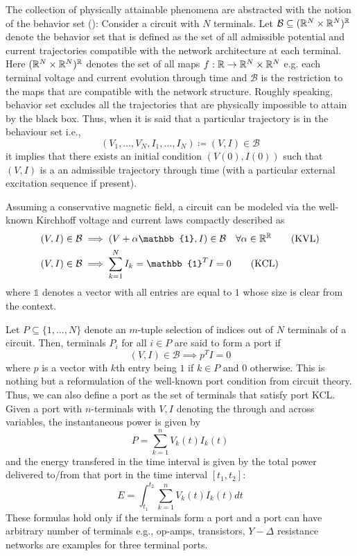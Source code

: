 The collection of physically attainable phenomena are abstracted with the notion of the behavior set (\cite{behavbook}):
Consider a circuit with $N$ terminals. Let $\mathcal{B}\subseteq (\mathbb{R}^N\times\mathbb{R}^N)^{\mathbb{R}}$ denote the behavior set 
that is defined as the set of all admissible potential and current trajectories compatible with the network architecture 
at each terminal. Here $(\mathbb{R}^N\times\mathbb{R}^N)^{\mathbb{R}}$ denotes 
the set of all maps $f: \mathbb{R}\to\mathbb{R}^N\times\mathbb{R}^N$ e.g. each terminal voltage and current evolution through time 
and $\mathcal{B}$ is the restriction to the maps that are compatible with the network structure. Roughly speaking, behavior
set excludes all the trajectories that are physically impossible to attain by the black box. Thus, when it is said that
a particular trajectory is in the behaviour set i.e., 
\[
(V_1,\ldots,V_N,I_1,\ldots,I_N)\coloneqq (V,I) \in\mathcal{B}
\]
it implies that there exists an initial condition $(V(0),I(0))$ such that $(V,I)$ is a an admissible trajectory through time
(with a particular external excitation sequence if present).


Assuming a conservative magnetic field, a circuit can be modeled via the well-known Kirchhoff voltage and current laws 
compactly described as 
\begin{align}
(V,I)\in\mathcal{B} &\implies (V+\alpha\mathbb{1},I)\in\mathcal{B} \quad \forall \alpha\in\Real^\Real \tag{KVL}\\
(V,I)\in\mathcal{B} &\implies \sum_{k=1}^N{I_k}=\mathbb{1}^TI=0 \tag{KCL}
\end{align}
where $\mathbb{1}$ denotes a vector with all entries are equal to $1$ whose size is clear from the context.

Let $P \subseteq \{1,\ldots,N\}$ denote an $m$-tuple selection of indices out of $N$ terminals of a circuit. Then, terminals
$P_i$ for all $i\in P$ are said to form a port if 
\[
(V,I)\in\mathcal{B} \implies p^TI=0 \tag{Port KCL}
\]
where $p$ is a vector with $k$th entry being $1$ if $k\in P$ and $0$ otherwise. This is nothing but a reformulation of the well-known 
port condition from circuit theory. Thus, we can also define a port as the set of terminals that satisfy port KCL. Given a port with 
$n$-terminals with $V,I$ denoting the through and across variables, the instantaneous power is given by 
\[
P = \sum_{k=1}^n{V_k(t)I_k(t)}
\]
and the energy transfered in the time interval is given by the total power delivered
to/from that port in the time interval $[t_1,t_2]$: 
\[
E = \int^{t_{2}}_{t_{1}}\sum_{k=1}^n{V_k(t)I_k(t)}dt
\]
These formulas hold only if the terminals form a port and a port can have arbitrary number of terminals 
e.g., op-amps, transistors, $Y-\Delta$ resistance networks are examples for three terminal ports. 


